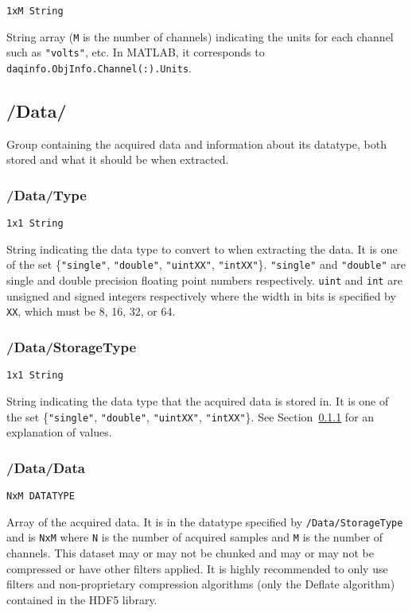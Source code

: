 \documentclass[12pt]{article} %
\begin{document}
\verb|1xM String|

String array (\verb|M| is the number of channels) indicating the units for each channel such as \verb|"volts"|, etc.
In MATLAB\textsuperscript{\textregistered}, it corresponds to \verb|daqinfo.ObjInfo.Channel(:).Units|.



\subsection{/Data/}

Group containing the acquired data and information about its datatype, both stored and what it should be when extracted.



\subsubsection{/Data/Type} \label{sec:data_type}

\verb|1x1 String|

String  indicating the data type to convert to when extracting the data.
It is one of the set \{\verb|"single"|, \verb|"double"|, \verb|"uintXX"|, \verb|"intXX"|\}.
\verb|"single"| and \verb|"double"| are single and double precision floating point numbers respectively.
\verb|uint| and \verb|int| are unsigned and signed integers respectively where the width in bits is specified by \verb|XX|, which must be 8, 16, 32, or 64.



\subsubsection{/Data/StorageType} \label{sec:data_storagetype}

\verb|1x1 String|

String  indicating the data type that the acquired data is stored in.
It is one of the set \{\verb|"single"|, \verb|"double"|, \verb|"uintXX"|, \verb|"intXX"|\}.
See Section~\ref{sec:data_type} for an explanation of values.



\subsubsection{/Data/Data} \label{sec:data_data} 

\verb|NxM DATATYPE|

Array of the acquired data.
It is in the datatype specified by \verb|/Data/StorageType| and is \verb|NxM| where \verb|N| is the number of acquired samples and \verb|M| is the number of channels.
This dataset may or may not be chunked and may or may not be compressed or have other filters applied.
It is highly recommended to only use filters and non-proprietary compression algorithms (only the Deflate algorithm) contained in the HDF5 library.
\end{document}
